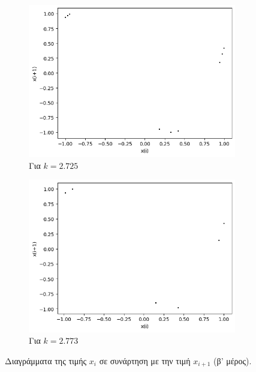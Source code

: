 \begin{figure}[ht]
\begin{subfigure}[b]{0.4\textwidth}
		\includegraphics[width=\textwidth]{LateX images/cheb q=0.9/g10}
		\caption{Για $k=2.725$}
		\label{f:k148}
	\end{subfigure}
	\hfill	
	\begin{subfigure}[b]{0.4\textwidth}
		\centering
		\includegraphics[width=\textwidth]{LateX images/cheb q=0.9/g11}
		\caption{Για $k=2.773$}
		\label{f:k149}
	\end{subfigure}
	\hfill

	\caption{Διαγράμματα της τιμής \(x_i\) σε συνάρτηση με την τιμή \(x_{i+1}\) (β' μέρος).}
	\label{f:k251}
\end{figure}

\clearpage